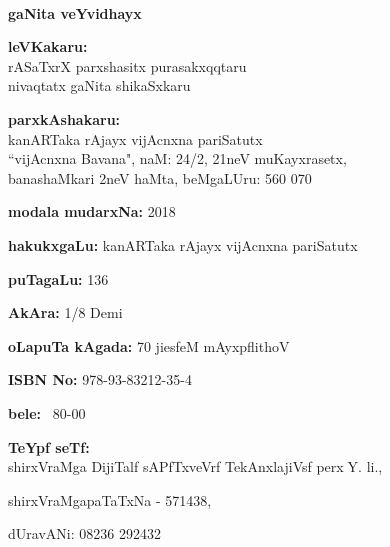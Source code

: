 ~
\thispagestyle{empty}

\vfill

\begin{center}
{\Large\bfseries gaNita veYvidhayx}\\

\smallskip
\smallskip
\smallskip

{\bfseries leVKakaru:}\\[0.1cm]
rASaTxrX parxshasitx purasakxqqtaru\\
nivaqtatx gaNita shikaSxkaru

\vfill

\smallskip

{\bfseries parxkAshakaru:}\\[0.1cm]
kanARTaka rAjayx vijAcnxna pariSatutx\\
``vijAcnxna Bavana", naM: {\rm 24/2}, {\rm 21}neV muKayxrasetx,\\
banashaMkari {\rm 2}neV haMta, beMgaLUru: {\rm 560 070}
\end{center}

\vfill

\begin{center}
{\bfseries modala mudarxNa:} {\rm 2018}

\vfill

{\bfseries hakukxgaLu:} kanARTaka rAjayx vijAcnxna pariSatutx

\vfill

{\bfseries puTagaLu:} {\rm 136}

\vfill

{\bfseries AkAra:} {\rm 1/8} Demi

\vfill

{\bfseries oLapuTa kAgada:} {\rm 70} jiesfeM mAyxpflithoV

\vfill

 {\rm {\bfseries ISBN No:}} {\rm 978-93-83212-35-4}

\vfill


{\bfseries bele:} \rupee \ {\rm 80-00}

\vfill

{\bfseries TeYpf seTf:}\\
 shirxVraMga DijiTalf sAPfTxveVrf TekAnxlajiVsf perx$\;$Y. li.,

shirxVraMgapaTaTxNa - {\rm 571438}, 

\smallskip

 dUravANi: {\rm 08236 292432}

\vfill

\end{center}
